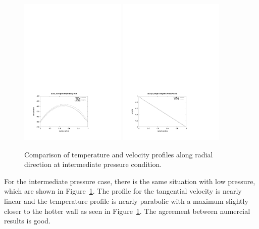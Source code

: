 \begin{figure}[htbp]
\begin{center}
\includegraphics[width=0.45\textwidth,viewport=41 46 411 298,clip=true]{../3D/taylor-couette/temperature-intermediate.pdf}
\includegraphics[width=0.45\textwidth,viewport=41 50 407 303,clip=true]{../3D/taylor-couette/velocity-intermediate.pdf}
\end{center}
\caption{Comparison of temperature and velocity profiles along radial direction at intermediate pressure condition.}
\label{tci-tv-fig}
\end{figure}

\medskip
For the intermediate pressure case, there is the same situation with low pressure, which are shown in
Figure~\ref{tci-tv-fig}. The profile for the tangential velocity is nearly linear
and the temperature profile is nearly parabolic with a maximum slightly closer to the hotter wall as seen in
Figure~\ref{tci-tv-fig}. The agreement between numercial results is good.

